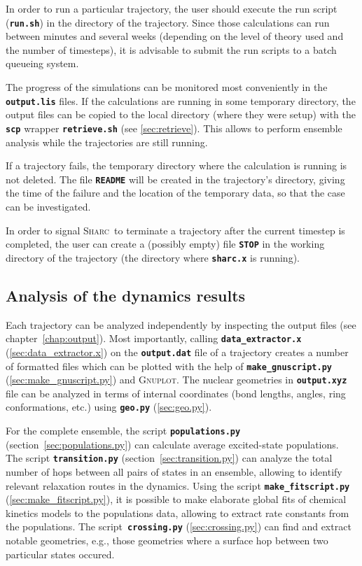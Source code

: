 \documentclass[a4paper,11pt,DIV=15,openany,twoside=false]{scrbook}
\newcommand{\sharc}{\textsc{Sharc}}
\newcommand{\ttt}[1]{\textbf{\texttt{#1}}}
\begin{document}
In order to run a particular trajectory, the user should execute the run script (\ttt{run.sh}) in the directory of the trajectory. Since those calculations can run between minutes and several weeks (depending on the level of theory used and the number of timesteps), it is advisable to submit the run scripts to a batch queueing system. 

The progress of the simulations can be monitored most conveniently in the \ttt{output.lis} files. If the calculations are running in some temporary directory, the output files can be copied to the local directory (where they were setup) with the \ttt{scp} wrapper \ttt{retrieve.sh} (see \ref{sec:retrieve}). This allows to perform ensemble analysis while the trajectories are still running.

If a trajectory fails, the temporary directory where the calculation is running is not deleted. The file \ttt{README} will be created in the trajectory's directory, giving the time of the failure and the location of the temporary data, so that the case can be investigated. 

In order to signal \sharc\ to terminate a trajectory after the current timestep is completed, the user can create a (possibly empty) file \ttt{STOP} in the working directory of the trajectory (the directory where \ttt{sharc.x} is running).

\subsection{Analysis of the dynamics results}

Each trajectory can be analyzed independently by inspecting the output files (see chapter~\ref{chap:output}). Most importantly, calling \ttt{data\_extractor.x} (\ref{sec:data_extractor.x}) on the \ttt{output.dat} file of a trajectory creates a number of formatted files which can be plotted with the help of \ttt{make\_gnuscript.py} (\ref{sec:make_gnuscript.py}) and \textsc{Gnuplot}.
The nuclear geometries in \ttt{output.xyz} file can be analyzed in terms of internal coordinates (bond lengths, angles, ring conformations, etc.) using \ttt{geo.py} (\ref{sec:geo.py}).

For the complete ensemble, the script \ttt{populations.py} (section~\ref{sec:populations.py}) can calculate average excited-state populations. 
The script \ttt{transition.py} (section~\ref{sec:transition.py}) can analyze the total number of hops between all pairs of states in an ensemble, allowing to identify relevant relaxation routes in the dynamics.
Using the script \ttt{make\_fitscript.py} (\ref{sec:make_fitscript.py}), it is possible to make elaborate global fits of chemical kinetics models to the populations data, allowing to extract rate constants from the populations.
The script~\ttt{crossing.py} (\ref{sec:crossing.py}) can find and extract notable geometries, e.g., those geometries where a surface hop between two particular states occured.
\end{document}
